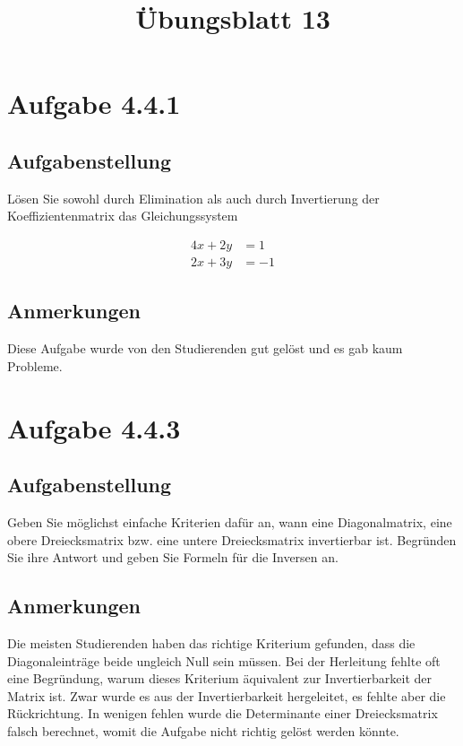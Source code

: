 \documentclass[a4paper]{article}
\title{Übungsblatt 13}
\date{}
\author{}
\begin{document}
\maketitle

\section{Aufgabe 4.4.1}

\subsection{Aufgabenstellung}

Lösen Sie sowohl durch Elimination als auch durch Invertierung der Koeffizientenmatrix das Gleichungssystem

\begin{align}
  4x+2y &= 1 \\
  2x + 3y &= -1
\end{align}

\subsection{Anmerkungen}

Diese Aufgabe wurde von den Studierenden gut gelöst und es gab kaum Probleme.

\section{Aufgabe 4.4.3}

\subsection{Aufgabenstellung}

Geben Sie möglichst einfache Kriterien dafür an, wann eine Diagonalmatrix, eine obere Dreiecksmatrix bzw. eine untere Dreiecksmatrix invertierbar ist. Begründen Sie ihre Antwort und geben Sie Formeln für die Inversen an.

\subsection{Anmerkungen}

Die meisten Studierenden haben das richtige Kriterium gefunden, dass die Diagonaleinträge beide ungleich Null sein müssen. Bei der Herleitung fehlte oft eine Begründung, warum dieses Kriterium äquivalent zur Invertierbarkeit der Matrix ist. Zwar wurde es aus der Invertierbarkeit hergeleitet, es fehlte aber die Rückrichtung. In wenigen fehlen wurde die Determinante einer Dreiecksmatrix falsch berechnet, womit die Aufgabe nicht richtig gelöst werden könnte.
\end{document}
